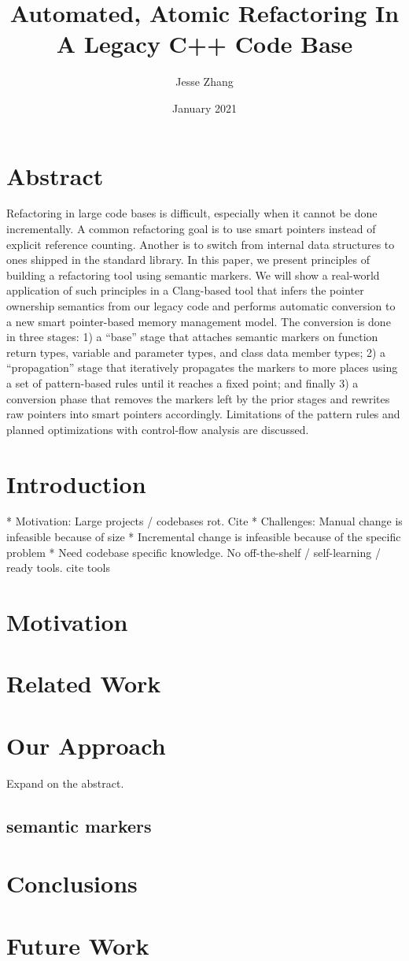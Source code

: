 \documentclass[sigplan,anonymous,review]{acmart}
\title{Automated, Atomic Refactoring In A Legacy C++ Code Base}
\author{Jesse Zhang}
\date{January 2021}
\begin{document}
\maketitle

\section{Abstract}
Refactoring in large code bases is difficult, especially when it cannot be done incrementally. A common refactoring goal is to use smart pointers instead of explicit reference counting. Another is to switch from internal data structures to ones shipped in the standard library. In this paper, we present principles of building a refactoring tool using semantic markers. We will show a real-world application of such principles in a Clang-based tool that infers the pointer ownership semantics from our legacy code and performs automatic conversion to a new smart pointer-based memory management model. The conversion is done in three stages: 1) a “base” stage that attaches semantic markers on function return types, variable and parameter types, and class data member types; 2) a “propagation” stage that iteratively propagates the markers to more places using a set of pattern-based rules until it reaches a fixed point; and finally 3) a conversion phase that removes the markers left by the prior stages and rewrites raw pointers into smart pointers accordingly. Limitations of the pattern rules and planned optimizations with control-flow analysis are discussed.

\section{Introduction}
* Motivation: Large projects / codebases rot. Cite
* Challenges: Manual change is infeasible because of size
* Incremental change is infeasible because of the specific problem
* Need codebase specific knowledge. No off-the-shelf / self-learning / ready tools. {cite tools}

\section{Motivation}

\section{Related Work}

\section{Our Approach}
Expand on the abstract.

\subsection{semantic markers}

\section{Conclusions}

\section{Future Work}
\end{document}
